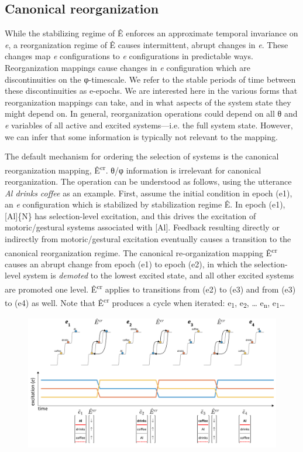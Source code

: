 \subsection{Canonical reorganization}

While the stabilizing regime of Ê enforces an approximate temporal invariance on \textit{e}, a reorganization regime of Ê causes intermittent, abrupt changes in \textit{e}. These changes map \textit{e} configurations to \textit{e} configurations in predictable ways. Reorganization mappings cause changes in \textit{e} configuration which are discontinuities on the φ-timescale. We refer to the stable periods of time between these discontinuities as e-epochs. We are interested here in the various forms that reorganization mappings can take, and in what aspects of the system state they might depend on. In general, reorganization operations could depend on all θ and \textit{e} variables of all active and excited systems—i.e. the full system state. However, we can infer that some information is typically not relevant to the mapping. 

  The default mechanism for ordering the selection of systems is the canonical reorganization mapping, Ê\textsuperscript{cr}. θ/φ information is irrelevant for canonical reorganization. The operation  can be understood as follows, using the utterance \textit{Al drinks coffee} as an example. First, assume the initial condition in epoch (e1), an \textit{e} configuration which is stabilized by stabilization regime Ê. In epoch (e1), [Al]\{N\} has selection-level excitation, and this drives the excitation of motoric/gestural systems associated with [Al]. Feedback resulting directly or indirectly from motoric/gestural excitation eventually causes a transition to the canonical reorganization regime. The canonical re-organization mapping Ê\textsuperscript{cr} causes an abrupt change from epoch (e1) to epoch (e2), in which the selection-level system is \textit{demoted} to the lowest excited state, and all other excited systems are promoted one level. Ê\textsuperscript{cr} applies to transitions from (e2) to (e3) and from (e3) to (e4) as well. Note that Ê\textsuperscript{cr} produces a cycle when iterated: e\textsubscript{1}, e\textsubscript{2}, … e\textsubscript{n}, e\textsubscript{1}… 

  
\begin{figure}
\includegraphics[width=\textwidth]{figures/Tilsen-img25.png}
\caption{\missingcaption}
\label{fig:2:18}
\end{figure}
 


